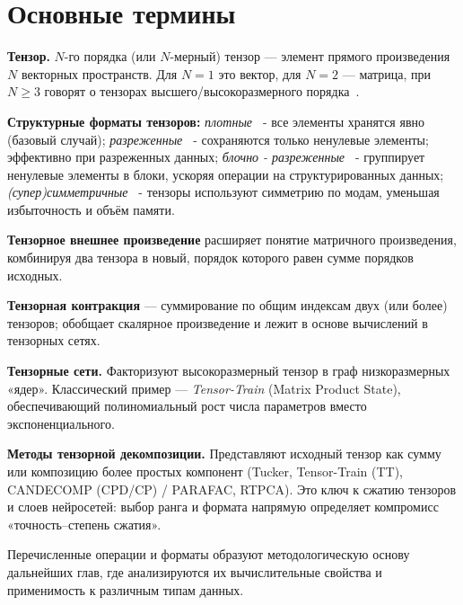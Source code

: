 \chapter{Основные термины}
\label{chap:preliminaries}

\textbf{Тензор.} $N$-го порядка (или $N$-мерный) тензор — элемент прямого произведения $N$ векторных пространств. Для $N{=}1$ это вектор, для $N{=}2$ — матрица, при $N\!\ge\!3$ говорят о тензорах высшего/высокоразмерного порядка~\cite{tensorly_parafac_tucker}.

\textbf{Структурные форматы тензоров:} \emph{плотные~\cite{tensor_calculus}} - все элементы хранятся явно (базовый случай); \emph{разреженные~\cite{sparse_matrices, sparse_tensor, sparse_and_block_sparse_tensors}} - сохраняются только ненулевые элементы; эффективно при разреженных данных; \emph{блочно - разреженные~\cite{sparse_and_block_sparse_tensors}} - группирует ненулевые элементы в блоки, ускоряя операции на структурированных данных; \emph{(супер)симметричные~\cite{tensor_calculus}} - тензоры используют симметрию по модам, уменьшая избыточность и объём памяти.

\textbf{Тензорное внешнее произведение} расширяет понятие матричного произведения, комбинируя два тензора в новый, порядок которого равен сумме порядков исходных.  

\textbf{Тензорная контракция} — суммирование по общим индексам двух (или более) тензоров; обобщает скалярное произведение и лежит в основе вычислений в тензорных сетях.  

\textbf{Тензорные сети.} Факторизуют высокоразмерный тензор в граф низкоразмерных «ядер». Классический пример — \emph{Tensor-Train} (Matrix Product State), обеспечивающий полиномиальный рост числа параметров вместо экспоненциального.  

\textbf{Методы тензорной декомпозиции.} Представляют исходный тензор как сумму или композицию более простых компонент (Tucker, Tensor-Train (TT), CANDECOMP (CPD/CP) / PARAFAC, RTPCA). Это ключ к сжатию тензоров и слоев нейросетей: выбор ранга и формата напрямую определяет компромисс «точность–степень сжатия». 

Перечисленные операции и форматы образуют методологическую основу дальнейших глав, где анализируются их вычислительные свойства и применимость к различным типам данных.